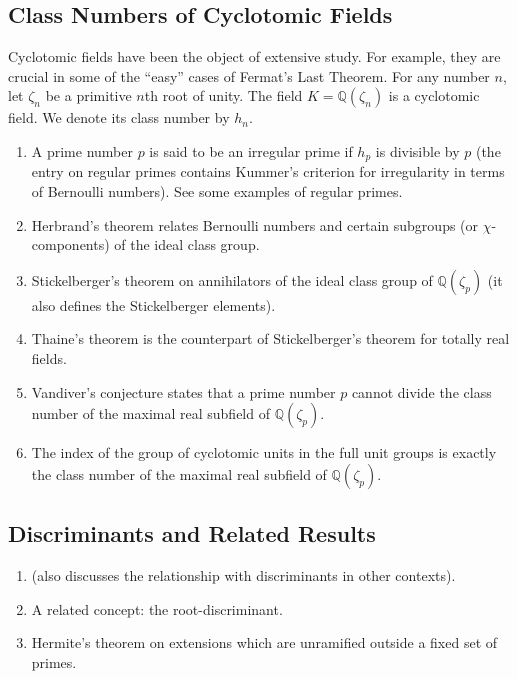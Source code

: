 \documentclass[12pt]{article}
\newcommand{\Rats}{\mathbb{Q}}
\begin{document}
\subsection{Class Numbers of Cyclotomic Fields}
Cyclotomic fields have been the object of extensive study. For example, they are crucial in some of the ``easy'' cases of Fermat's Last Theorem. For any number $n$, let $\zeta_n$ be a primitive $n$th root of unity. The field $K=\Rats(\zeta_n)$ is a cyclotomic field. We denote its class number by $h_n$.
\begin{enumerate}
\item A prime number $p$ is said to be an irregular prime if $h_p$ is divisible by $p$ (the entry on regular primes contains Kummer's criterion for irregularity in terms of Bernoulli numbers). See some examples of regular primes. 

\item Herbrand's theorem relates Bernoulli numbers and certain subgroups (or $\chi$-components) of the ideal class group.

\item Stickelberger's theorem on annihilators of the ideal class group of $\Rats(\zeta_p)$ (it also defines the Stickelberger elements). 

\item Thaine's theorem is the counterpart of Stickelberger's theorem for totally real fields.

\item Vandiver's conjecture states that a prime number $p$ cannot divide the class number of the maximal real subfield of $\Rats(\zeta_p)$.

\item The index of the group of cyclotomic units in the full unit groups is exactly the class number of the maximal real subfield of $\Rats(\zeta_p)$.
\end{enumerate}

\subsection{Discriminants and Related Results}
\begin{enumerate}
\item {} (also discusses the relationship with discriminants in other contexts).
\item A related concept: the root-discriminant.
\item Hermite's theorem on extensions which are unramified outside a fixed set of primes.

\end{enumerate}
\end{document}
